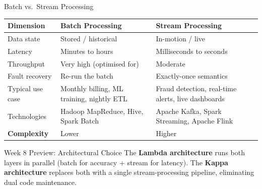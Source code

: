 \documentclass[aspectratio=169,10pt]{beamer}
\begin{document}
\begin{frame}{Batch vs.\ Stream Processing}
  \centering
  \renewcommand{\arraystretch}{1.4}
  \begin{tabular}{p{2.6cm}p{4.3cm}p{4.3cm}}
    \toprule
    \textbf{Dimension} & \textbf{Batch Processing} & \textbf{Stream Processing} \\
    \midrule
    Data state       & Stored / historical        & In-motion / live \\
    Latency          & Minutes to hours           & Milliseconds to seconds \\
    Throughput       & Very high (optimised for)  & Moderate \\
    Fault recovery   & Re-run the batch           & Exactly-once semantics \\
    Typical use case & Monthly billing, ML training, nightly ETL & Fraud detection, real-time alerts, live dashboards \\
    Technologies     & Hadoop MapReduce, Hive, Spark Batch & Apache Kafka, Spark Streaming, Apache Flink \\
    \textbf{Complexity} & Lower                  & Higher \\
    \bottomrule
  \end{tabular}
  \vspace{8pt}
  \begin{alertblock}{Week 8 Preview: Architectural Choice}
    The \textbf{Lambda architecture} runs both layers in parallel (batch for accuracy + stream for latency).  The \textbf{Kappa architecture} replaces both with a single stream-processing pipeline, eliminating dual code maintenance.
  \end{alertblock}
\end{frame}

\end{document}
